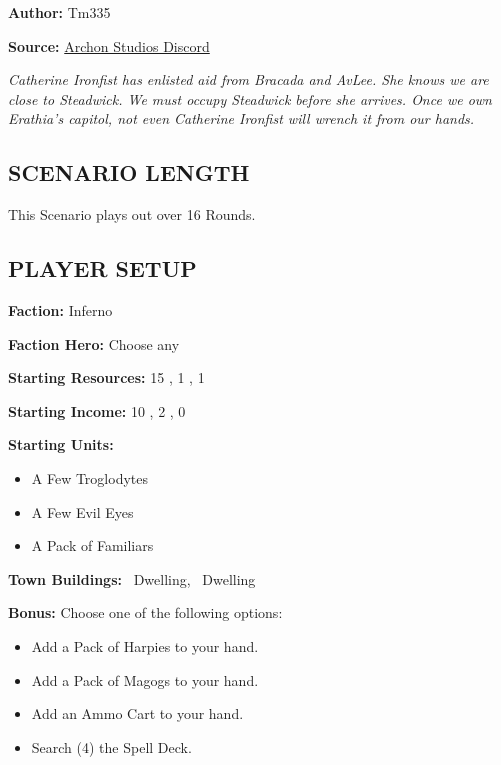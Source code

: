 
\begin{multicols*}{2}

\textbf{Author:} Tm335

\textbf{Source:} \href{https://discord.com/channels/740870068178649108/1246353361456861276/1246353361456861276}{Archon Studios Discord}

\textit{Catherine Ironfist has enlisted aid from Bracada and AvLee.
She knows we are close to Steadwick.
We must occupy Steadwick before she arrives.
Once we own Erathia's capitol, not even Catherine Ironfist will wrench it from our hands.}

\subsection*{\MakeUppercase{Scenario Length}}

This Scenario plays out over 16 Rounds.

\subsection*{\MakeUppercase{Player Setup}}

\textbf{Faction:} Inferno

\textbf{Faction Hero:} Choose any

\textbf{Starting Resources:} 15 , 1 , 1 

\textbf{Starting Income:} 10 , 2 , 0 

\textbf{Starting Units:}

\begin{itemize}
  \item A Few Troglodytes
  \item A Few Evil Eyes
  \item A Pack of Familiars
\end{itemize}

\textbf{Town Buildings:} \bronze\ Dwelling, \silver\ Dwelling

\textbf{Bonus:} Choose one of the following options:
\begin{itemize}
  \item Add a Pack of Harpies to your hand.
  \item Add a Pack of Magogs to your hand.
  \item Add an Ammo Cart to your hand.
  \item Search (4) the Spell Deck.
\end{itemize}


\end{multicols*}
